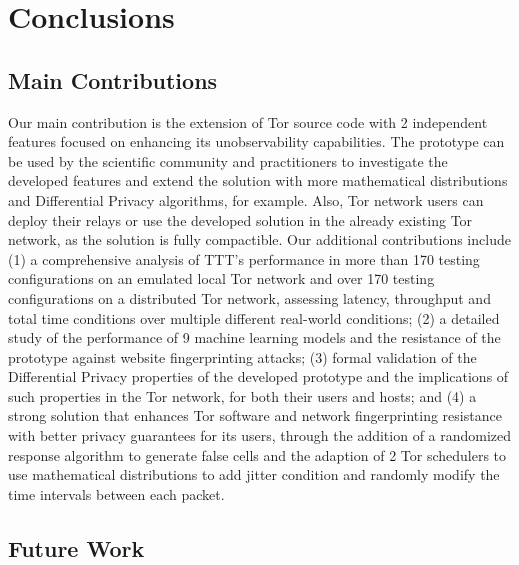 
%

\chapter{Conclusions}\label{cha:conclusions}

\section{Main Contributions}\label{sec:main_conclusions}

Our main contribution is the extension of Tor source code with 2 independent features focused on enhancing its unobservability capabilities. The prototype can be used by the scientific community and practitioners to investigate the developed features and extend the solution with more mathematical distributions and Differential Privacy algorithms, for example. 
Also, Tor network users can deploy their relays or use the developed solution in the already existing Tor network, as the solution is fully compactible. Our additional contributions include (1) a comprehensive analysis of TTT's performance in more than 170 testing configurations on an emulated local Tor network and over 170 testing configurations on a distributed Tor network, assessing latency, throughput and total time conditions over multiple different real-world conditions; (2) a detailed study of the performance of 9 machine learning models and the resistance of the prototype against website fingerprinting attacks; (3) formal validation of the Differential Privacy properties of the developed prototype and the implications of such properties in the Tor network, for both their users and hosts; and (4) a strong solution that enhances Tor software and network fingerprinting resistance with better privacy guarantees for its users, through the addition of a randomized response algorithm to generate false cells and the adaption of 2 Tor schedulers to use mathematical distributions to add jitter condition and randomly modify the time intervals between each packet.

\section{Future Work}\label{sec:future_work}

